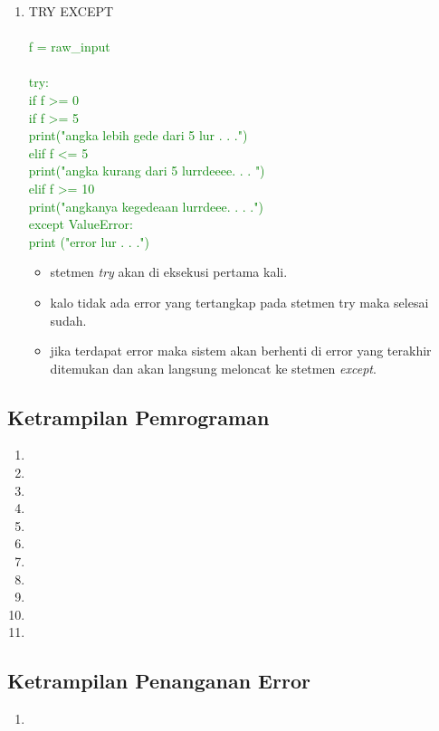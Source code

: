 \documentclass[12pt]{article}
\begin{document}
\begin{enumerate}
			\item TRY EXCEPT\\\\
				\textcolor{green}{
					f = raw\_input\\
					\\
					try:\\
					if f >= 0\\
						if f >= 5\\
							print("angka lebih gede dari 5 lur . . .")\\
						elif f <= 5\\
							print("angka kurang dari 5 lurrdeeee. . . ")\\
					elif f >= 10\\
						print("angkanya kegedeaan lurrdeee. . . .")\\
					except ValueError:\\
					print ("error lur . . .")\\
					}
					
				\begin{itemize}
					\item stetmen \textit{try} akan di eksekusi pertama kali.
					\item kalo tidak ada error yang tertangkap pada stetmen try maka selesai sudah.
					\item jika terdapat error maka sistem akan berhenti di error yang terakhir ditemukan dan akan langsung meloncat ke stetmen \textit{except}.
				\end{itemize}
				
			
		\end{enumerate}
	\subsection{Ketrampilan Pemrograman}
			\begin{enumerate}
				\item 
				\item 
				\item 
				\item 
				\item 
				\item 
				\item 
				\item 
				\item 
				\item 
				\item 
				
			\end{enumerate}
			
	
	\subsection{Ketrampilan Penanganan Error}
		\begin{enumerate}
			\item 
			
		\end{enumerate}
\end{document}
